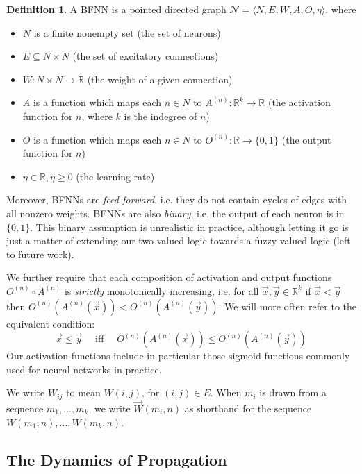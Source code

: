\documentclass[letterpaper]{article}
\theoremstyle{definition}
\newtheorem{definition}{Definition}
\newcommand{\set}[1]{\{ #1 \}}
\newcommand{\Net}{\mathcal{N}}
\begin{document}
\begin{definition} A BFNN is a pointed directed graph ${\Net = \langle N, E, W, A, O, \eta \rangle}$, where
\begin{itemize}
    \item $N$ is a finite nonempty set (the set of neurons)
    \item $E \subseteq N \times N$ (the set of excitatory connections)
    \item $W : N \times N \to \mathbb{R}$ (the weight of a given connection)
    
    \item $A$ is a function which maps each $n \in N$ to
    $A^{(n)} : \mathbb{R}^k \to \mathbb{R}$ (the activation function for $n$, where $k$ is the indegree of $n$)
    \item $O$ is a function which maps each $n \in N$ to 
    $O^{(n)} : \mathbb{R} \to \set{0, 1}$ (the output function for $n$)
    \item $\eta \in \mathbb{R}, \eta \geq 0$ (the learning rate)
\end{itemize}
Moreover, BFNNs are \emph{feed-forward}, i.e. they do not contain cycles of edges with all nonzero weights.  BFNNs are also \emph{binary}, i.e. the output of each neuron is in $\set{0, 1}$.  This binary assumption is unrealistic in practice, although letting it go is just a matter of extending our two-valued logic towards a fuzzy-valued logic (left to future work).

We further require that each composition of activation and output functions ${O^{(n)} \circ A^{(n)}}$ is \textit{strictly} monotonically increasing, i.e. for all $\vec{x}, \vec{y} \in \mathbb{R}^k$ if $\vec{x} < \vec{y}$ then $O^{(n)}(A^{(n)}(\vec{x})) < O^{(n)}(A^{(n)}(\vec{y}))$.  We will more often refer to the equivalent condition:
\begin{equation}\tag{$\ast$}
\label{eqn:increasing}
\vec{x} \leq \vec{y} \quad \mbox{ iff } \quad  O^{(n)}(A^{(n)}(\vec{x})) \leq O^{(n)}(A^{(n)}(\vec{y}))
\end{equation}
Our activation functions include in particular those sigmoid functions commonly used for neural networks in practice.
\end{definition}

We write $W_{ij}$ to mean $W(i,j)$, for ${(i, j) \in E}$.  When $m_i$ is drawn from a sequence ${m_1, \ldots, m_k}$, we write $\overrightarrow{W}(m_i, n)$ as shorthand for the sequence $W(m_1, n), \ldots, W(m_k, n)$.


\subsection{The Dynamics of Propagation}
\end{document}
